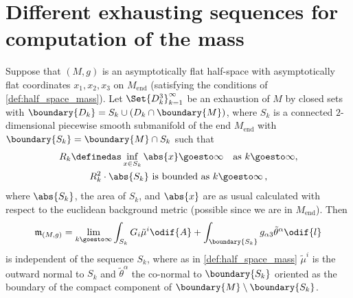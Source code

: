 \documentclass[titlepage,numbers=noenddot,oneside,%
cleardoublepage=empty,paper=a4,fontsize=11pt,%
english,%
]{scrartcl}
\newcommand*{\mathcomma}{\,,}
\newcommand{\Mend}{M_{\mathrm{end}}} %
\newcommand{\mass}[2]{\mathfrak{m}_{(#1,#2)}} %
\newcommand{\todomark}{%
    \colorbox{purple}{%
        \textnormal\ttfamily\bfseries\color{white}%
        TODO%
    }%
}
\newcommand{\todo}[1][]{%
    \ifstrempty{#1}{%
        \def\todotext{Todo}%
    }{%
        \def\todotext{Todo: #1}%
    }%
    \todomark%
    {%
        \marginpar{%
            \raggedright\normalfont\sffamily\scriptsize\todotext%
        }%
    }%
}
\begin{document}
\newpage
\appendix
\section{Different exhausting sequences for computation of the mass}
\begin{proposition}\label{prop:mass_independent_of_exhausting_sequence}
    Suppose that \( (M,g) \) is an asymptotically flat half-space with asymptotically flat coordinates \( x_1,x_2,x_3 \) on \( \Mend \) (satisfying the conditions of \cref{def:half_space_mass}). Let \( \Set{D_k^3}_{k=1}^{\infty} \) be an exhaustion of \( M \) by closed sets with \( \boundary{D_k}=S_k\cup (D_k\cap \boundary{M}) \), where \( S_k \) is a connected \( 2 \)-dimensional piecewise smooth submanifold of the end \( \Mend \) with \( \boundary{S_k}=\boundary{M}\cap S_k \) such that
    \begin{gather*}
        R_k\definedas \inf_{x\in S_k} \abs{x}\goesto \infty\quad \text{as \( k\goesto \infty \)},\\
        R_k^2\cdot \abs{S_k} \text{ is bounded as \( k\goesto \infty \)}\mathcomma
    \end{gather*}
    where \( \abs{S_k} \), the area of \( S_k \), and \( \abs{x} \) are as usual calculated with respect to the euclidean background metric (possible since we are in \( \Mend \)). Then
    \begin{equation*}
        \mass{M}{g}=\lim_{k \goesto \infty}\int_{S_k}G_i\tilde{\mu}^i\odif{A}+\int_{\boundary{S_k}}g_{\alpha 3}\tilde{\theta}^\alpha\odif{l}
    \end{equation*}
    is independent of the sequence \( S_k \), where as in \cref{def:half_space_mass} \( \tilde{\mu}^i \) is the outward normal to \( S_k \) and \( \tilde{\theta}^\alpha \) the co-normal to \( \boundary{S_k} \) oriented as the boundary of the compact component of \( \boundary{M}\setminus \boundary{S_k} \).
\end{proposition}
\end{document}
